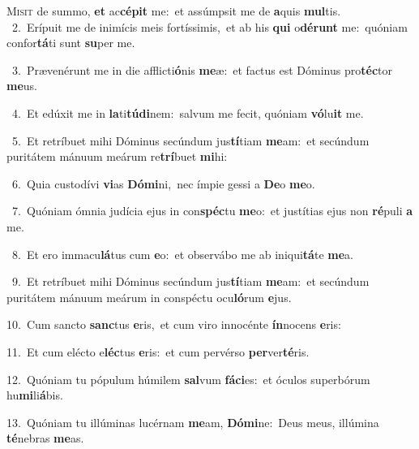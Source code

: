 \lettrine{\initial\textcolor{\initialcolor}{M}}{isit} de summo, \textbf{et} ac\-\textbf{cé}\-\textbf{pit} me:~\star et assúmpsit me de \textbf{a}\-quis \textbf{mul}\-tis.\\
{\numbfont\textcolor{\numbcolor}{~2.}}~Erípuit me de inimícis meis fortíssimis,~\dagger et ab his \textbf{qui} o\-\textbf{dé}\-\textbf{runt} me:~\star quóniam confor\-\textbf{tá}\-ti sunt \textbf{su}\-per me.\par
{\numbfont\textcolor{\numbcolor}{~3.}}~Prævenérunt me in die afflicti\-\textbf{ó}\-nis \textbf{me}\-æ:~\star et factus est Dóminus pro\-\textbf{téc}\-tor \textbf{me}\-us.\par
{\numbfont\textcolor{\numbcolor}{~4.}}~Et edúxit me in \textbf{la}\-ti\-\textbf{tú}\-\textbf{di}nem:~\star salvum me fecit, quóniam \textbf{vó}\-lu\textbf{it} me.\par
{\numbfont\textcolor{\numbcolor}{~5.}}~Et retríbuet mihi Dóminus secúndum jus\-\textbf{tí}\-tiam \textbf{me}\-am:~\star et secúndum puritátem mánuum meárum re\-\textbf{trí}\-buet \textbf{mi}\-hi:\par
{\numbfont\textcolor{\numbcolor}{~6.}}~Quia custodívi \textbf{vi}\-as \textbf{Dó}\-\textbf{mi}ni,~\star nec ímpie gessi a \textbf{De}\-o \textbf{me}\-o.\par
{\numbfont\textcolor{\numbcolor}{~7.}}~Quóniam ómnia judícia ejus in con\-\textbf{spéc}\-tu \textbf{me}\-o:~\star et justítias ejus non \textbf{ré}\-puli \textbf{a} me.\par
{\numbfont\textcolor{\numbcolor}{~8.}}~Et ero immacu\-\textbf{lá}\-tus cum \textbf{e}\-o:~\star et observábo me ab iniqui\-\textbf{tá}\-te \textbf{me}\-a.\par
{\numbfont\textcolor{\numbcolor}{~9.}}~Et retríbuet mihi Dóminus secúndum jus\-\textbf{tí}\-tiam \textbf{me}\-am:~\star et secúndum puritátem mánuum meárum in conspéctu ocu\-\textbf{ló}\-rum \textbf{e}\-jus.\par
{\numbfont\textcolor{\numbcolor}{10.}}~Cum sancto \textbf{sanc}\-tus \textbf{e}\-ris,~\star et cum viro innocénte \textbf{ín}\-nocens \textbf{e}\-ris:\par
{\numbfont\textcolor{\numbcolor}{11.}}~Et cum elécto e\-\textbf{léc}\-tus \textbf{e}\-ris:~\star et cum pervérso \textbf{per}\-ver\-\textbf{té}\-ris.\par
{\numbfont\textcolor{\numbcolor}{12.}}~Quóniam tu pópulum húmilem \textbf{sal}\-vum \textbf{fá}\-\textbf{ci}es:~\star et óculos superbórum hu\-\textbf{mi}\-li\-\textbf{á}\-bis.\par
{\numbfont\textcolor{\numbcolor}{13.}}~Quóniam tu illúminas lucérnam \textbf{me}\-am, \textbf{Dó}\-\textbf{mi}ne:~\star Deus meus, illúmina \textbf{té}\-nebras \textbf{me}\-as.\par
